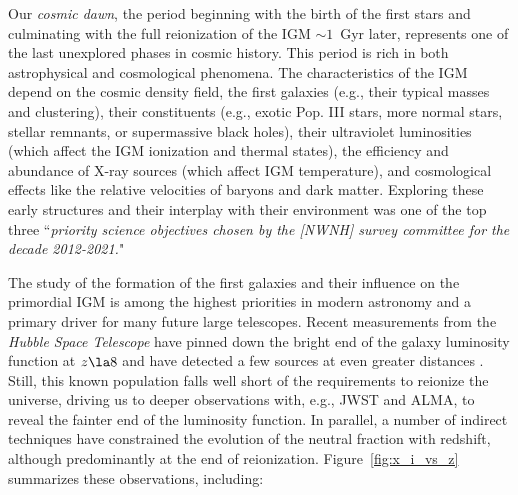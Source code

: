 \documentclass[preprint]{aastex}
\begin{document}

Our {\it cosmic dawn}, the period beginning with the birth of the first stars and culminating with the full
reionization of the IGM $\sim 1$~Gyr later, represents one of the last unexplored phases in cosmic history. 
This period is rich in both astrophysical and cosmological phenomena. 
The characteristics of the IGM depend on the cosmic density field, the first galaxies (e.g., their typical masses and 
clustering), their constituents (e.g., exotic Pop. III 
stars, more normal stars, stellar remnants, or supermassive black holes), their ultraviolet luminosities (which affect
the IGM ionization and thermal states), the efficiency and abundance of X-ray sources (which affect IGM temperature), 
and cosmological effects like the relative velocities of baryons and dark matter. 
Exploring these early structures and their interplay with their environment was one of the top three ``{\it priority science objectives chosen by 
the [NWNH] survey committee for the decade 2012-2021.}"


The study of the formation of the first galaxies and their influence on the primordial IGM is 
among the highest priorities in modern astronomy 
and a primary driver for many future large telescopes.  Recent measurements from the {\it Hubble Space Telescope} 
have pinned down the bright end of the galaxy luminosity function 
at $z \la 8$ \citep{bouwens_et_al2010, schenker_et_al2013} and have detected a few sources at even greater 
distances \citep{ellis_et_al2013, oesch_et_al2013}. Still, this known population falls well short of the requirements to reionize the universe, driving us to deeper observations with, e.g., JWST and ALMA, to reveal the fainter end of the luminosity function. 
In parallel, a number of indirect techniques have constrained the evolution of the neutral fraction
with redshift, although predominantly at the end of reionization. Figure~\ref{fig:x_i_vs_z} summarizes 
these observations, including: 
\end{document}

